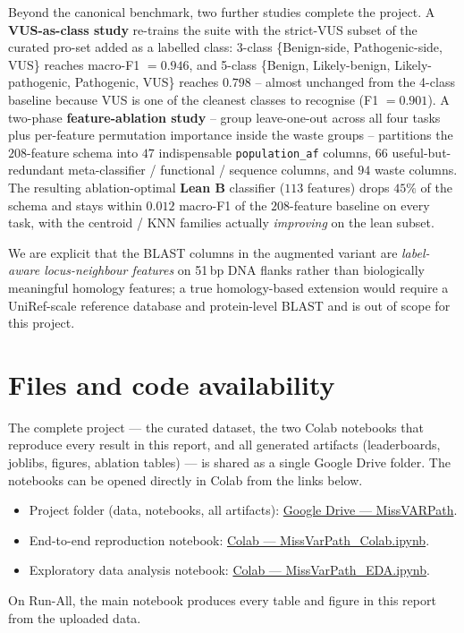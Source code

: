 \documentclass[11pt,a4paper]{article}
\begin{document}
Beyond the canonical benchmark, two further studies complete the project.
A \textbf{VUS-as-class study} re-trains the suite
with the strict-VUS subset of the curated pro-set added as a labelled
class: 3-class \{Benign-side, Pathogenic-side, VUS\} reaches macro-F1
$=0.946$, and 5-class \{Benign, Likely-benign, Likely-pathogenic,
Pathogenic, VUS\} reaches $0.798$ -- almost unchanged from the
4-class baseline because VUS is one of the cleanest classes to recognise
(F1 $=0.901$). A two-phase \textbf{feature-ablation study} -- group leave-one-out across all four
tasks plus per-feature permutation importance inside the waste groups --
partitions the $208$-feature schema into $47$ indispensable
\texttt{population\_af} columns, $66$ useful-but-redundant
meta-classifier / functional / sequence columns, and $94$ waste columns.
The resulting ablation-optimal \textbf{Lean B} classifier
($113$ features) drops $45\%$ of the schema and stays
within $0.012$ macro-F1 of the $208$-feature baseline on every task,
with the centroid / KNN families actually \emph{improving} on the lean
subset.

We are explicit that the BLAST
columns in the augmented variant are \emph{label-aware locus-neighbour
features} on 51\,bp DNA flanks rather than biologically meaningful homology
features; a true homology-based extension would
require a UniRef-scale reference database and protein-level BLAST and is
out of scope for this project.




\section*{Files and code availability}
The complete project — the curated dataset, the two Colab notebooks that reproduce every result in this report, and all generated artifacts (leaderboards, joblibs, figures, ablation tables) — is shared as a single Google Drive folder. The notebooks can be opened directly in Colab from the links below.

\begin{itemize}[leftmargin=*]
    \item Project folder (data, notebooks, all artifacts): \href{https://drive.google.com/drive/folders/1Sy5dnzYGiwCGXYRMXiCGnyJt04SuOphv}{Google Drive — MissVARPath}.
    \item End-to-end reproduction notebook: \href{https://colab.research.google.com/drive/1ceyQjc73Gsm2bfclc7PznBS_dQ0EB74a}{Colab — MissVarPath\_Colab.ipynb}.
    \item Exploratory data analysis notebook: \href{https://colab.research.google.com/drive/1Mk_cXAjRAKlRVjWplSdtV9DCR-t0P0iU}{Colab — MissVarPath\_EDA.ipynb}.
\end{itemize}

On Run-All, the main notebook produces every table and figure in this report from the uploaded data.
\end{document}
